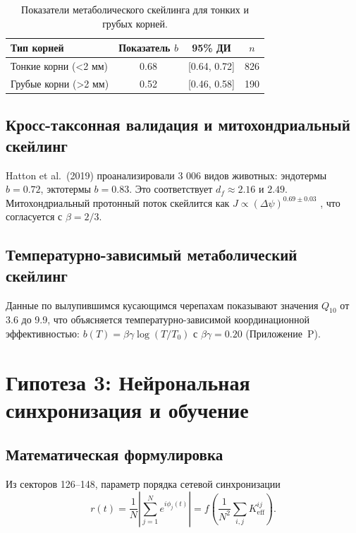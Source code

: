 \documentclass[11pt,a4paper]{article}
\begin{document}
	\begin{table}[H]
		\centering
		\caption{Показатели метаболического скейлинга для тонких и грубых корней.}
		\label{tab:plant-scaling}
		\begin{tabular}{lccc}
			\toprule
			\textbf{Тип корней} & \textbf{Показатель \(b\)} & \textbf{95\% ДИ} & \textbf{\(n\)} \\
			\midrule
			Тонкие корни (<2 мм) & 0.68 & [0.64, 0.72] & 826 \\
			Грубые корни (>2 мм) & 0.52 & [0.46, 0.58] & 190 \\
			\bottomrule
		\end{tabular}
	\end{table}
	
	\subsection{Кросс-таксонная валидация и митохондриальный скейлинг}
	
	Hatton et al.\ (2019) проанализировали 3 006 видов животных: эндотермы \(b=0.72\), эктотермы \(b=0.83\). Это соответствует \(d_f \approx 2.16\) и \(2.49\). Митохондриальный протонный поток скейлится как \(J \propto (\Delta \psi)^{0.69 \pm 0.03}\) \cite{West2023}, что согласуется с \(\beta=2/3\).
	
	\subsection{Температурно-зависимый метаболический скейлинг}
	
	Данные по вылупившимся кусающимся черепахам показывают значения \(Q_{10}\) от 3.6 до 9.9, что объясняется температурно-зависимой координационной эффективностью: \(b(T) = \beta\gamma \log(T/T_0)\) с \(\beta\gamma = 0.20\) (Приложение~P).
	
	\section{Гипотеза 3: Нейрональная синхронизация и обучение}
	
	\subsection{Математическая формулировка}
	
	Из секторов 126–148, параметр порядка сетевой синхронизации
	\begin{equation}
		r(t) = \frac{1}{N}\left|\sum_{j=1}^N e^{i\phi_j(t)}\right| = f\left(\frac{1}{N^2}\sum_{i,j} K_{\text{eff}}^{ij}\right).
		\label{eq:sync_order}
	\end{equation}
	
\end{document}
